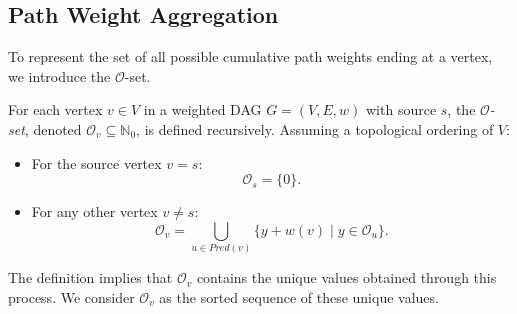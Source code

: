 \subsection{Path Weight Aggregation}
\label{subsec:o_set_def}

To represent the set of all possible cumulative path weights ending at a vertex, we introduce the $\mathcal{O}$-set.

\begin{definition}
    \label{def:o_set}
    For each vertex $v \in V$ in a weighted DAG $G=(V, E, w)$ with source $s$, the \emph{$\mathcal{O}$-set}, denoted $\mathcal{O}_v \subseteq \mathbb{N}_0$, is defined recursively. Assuming a topological ordering of $V$:
    \begin{itemize}
        \item For the source vertex $v = s$:
              \[ \mathcal{O}_s = \{0\}. \]
        \item For any other vertex $v \neq s$:
              \[ \mathcal{O}_v = \bigcup_{u \in Pred(v)} \{ y + w(v) \mid y \in \mathcal{O}_u \}. \]
    \end{itemize}
    The definition implies that $\mathcal{O}_v$ contains the unique values obtained through this process. We consider $\mathcal{O}_v$ as the sorted sequence of these unique values.
\end{definition}

